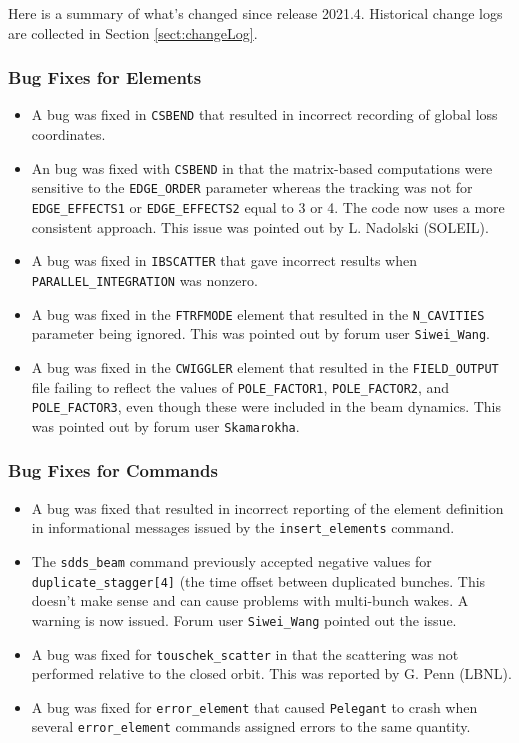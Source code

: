 \documentclass[11pt]{article}
\begin{document}
Here is a summary of what's changed since release 2021.4.  Historical change logs are collected in Section
\ref{sect:changeLog}.

\subsubsection{Bug Fixes for Elements}

\begin{itemize}
\item A bug was fixed in \verb|CSBEND| that resulted in incorrect recording of global loss coordinates.
\item An bug was fixed with \verb|CSBEND| in that the matrix-based computations were sensitive to the
  \verb|EDGE_ORDER| parameter whereas the tracking was not for \verb|EDGE_EFFECTS1| or \verb|EDGE_EFFECTS2|
  equal to 3 or 4. The code now uses a more consistent approach. This issue was pointed out by L. Nadolski (SOLEIL).
\item A bug was fixed in \verb|IBSCATTER| that gave incorrect results when \verb|PARALLEL_INTEGRATION| was nonzero.
\item A bug was fixed in the \verb|FTRFMODE| element that resulted in the \verb|N_CAVITIES| parameter being ignored.
  This was pointed out by forum user \verb|Siwei_Wang|.
\item A bug was fixed in the \verb|CWIGGLER| element that resulted in the \verb|FIELD_OUTPUT| file failing to reflect
  the values of \verb|POLE_FACTOR1|, \verb|POLE_FACTOR2|, and \verb|POLE_FACTOR3|, even though these were included
  in the beam dynamics. This was pointed out by forum user \verb|Skamarokha|.
\end{itemize}

\subsubsection{Bug Fixes for Commands}
\begin{itemize}
\item A bug was fixed that resulted in incorrect reporting of the element definition in informational messages
  issued by the \verb|insert_elements| command.
\item The \verb|sdds_beam| command previously accepted negative values for \verb|duplicate_stagger[4]| (the time
  offset between duplicated bunches. This doesn't make sense and can cause problems with multi-bunch wakes.
  A warning is now issued.
  Forum user \verb|Siwei_Wang| pointed out the issue.
\item A bug was fixed for \verb|touschek_scatter| in that the scattering was not performed relative to the
  closed orbit. This was reported by G. Penn (LBNL).
\item A bug was fixed for \verb|error_element| that caused \verb|Pelegant| to crash when several \verb|error_element|
  commands assigned errors to the same quantity.
\end{itemize}
\end{document}
